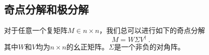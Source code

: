 


\subsection{奇点分解和极分解}
对于任意一个复矩阵$M\in n\times n$，我们总可以进行如下的奇点分解
\begin{equation}
M=W \Sigma V^{\dagger}~.
\end{equation}
其中$W$和$V$均为$n\times n$的幺正矩阵。$\Sigma$是一个非负的对角阵。



